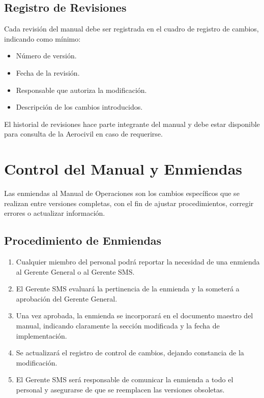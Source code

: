 \subsection*{Registro de Revisiones}
Cada revisión del manual debe ser registrada en el cuadro de registro de cambios, indicando como mínimo:  
\begin{itemize}
  \item Número de versión.  
  \item Fecha de la revisión.  
  \item Responsable que autoriza la modificación.
  \item Descripción de los cambios introducidos.  
    
\end{itemize}

El historial de revisiones hace parte integrante del manual y debe estar disponible para consulta de la Aerocivil en caso de requerirse.


\section{Control del Manual y Enmiendas}

Las enmiendas al Manual de Operaciones son los cambios específicos que se realizan entre versiones completas, con el fin de ajustar procedimientos, corregir errores o actualizar información.  

\subsection*{Procedimiento de Enmiendas}
\begin{enumerate}
  \item Cualquier miembro del personal podrá reportar la necesidad de una enmienda al Gerente General o al Gerente SMS.  
  \item El Gerente SMS evaluará la pertinencia de la enmienda y la someterá a aprobación del Gerente General.  
  \item Una vez aprobada, la enmienda se incorporará en el documento maestro del manual, indicando claramente la sección modificada y la fecha de implementación.  
  \item Se actualizará el registro de control de cambios, dejando constancia de la modificación.  
  \item El Gerente SMS será responsable de comunicar la enmienda a todo el personal y asegurarse de que se reemplacen las versiones obsoletas.  
\end{enumerate}

